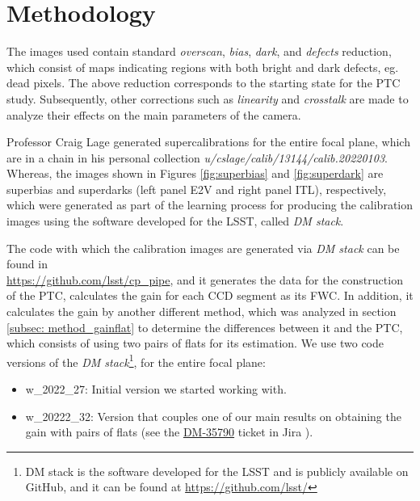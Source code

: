 \section{Methodology} \label{sec:methods}

The images used contain standard \textit{overscan}, \textit{bias}, \textit{dark}, and \textit{defects} reduction, which consist of maps indicating regions with both bright and dark defects, eg. dead pixels. The above reduction corresponds to the starting state for the PTC study. Subsequently, other corrections such as \textit{linearity} and \textit{crosstalk} are made to analyze their effects on the main parameters of the camera.

\vspace{3mm}

Professor Craig Lage generated supercalibrations for the entire focal plane, which are in a chain in his personal collection \textit{u/cslage/calib/13144/calib.20220103}. Whereas, the images shown in Figures \ref{fig:superbias} and \ref{fig:superdark} are superbias and superdarks (left panel E2V and right panel ITL), respectively, which were generated as part of the learning process for producing the calibration images using the software developed for the LSST, called \textit{DM stack}.

\vspace{3mm}

The code with which the calibration images are generated via \textit{DM stack} can be found in \\  \href{https://github.com/lsst/cp_pipe}{https://github.com/lsst/cp\_pipe}, and it generates the data for the construction of the PTC, calculates the gain for each CCD segment as its FWC. In addition, it calculates the gain by another different method, which was analyzed in section \ref{subsec: method_gainflat} to determine the differences between it and the PTC, which consists of using two pairs of flats for its estimation. We use two code versions of the \textit{DM stack}\footnote{DM stack is the software developed for the LSST and is publicly available on GitHub, and it can be found at \href{https://github.com/lsst/}{https://github.com/lsst/}},  for the entire focal plane: 


\begin{itemize}
    \item w\_2022\_27: Initial version we started working with. 
    \item w\_20222\_32: Version that couples one of our main results on obtaining the gain with pairs of flats (see the \href{https://jira.lsstcorp.org/browse/DM-35790}{DM-35790} ticket in Jira ).
\end{itemize}

